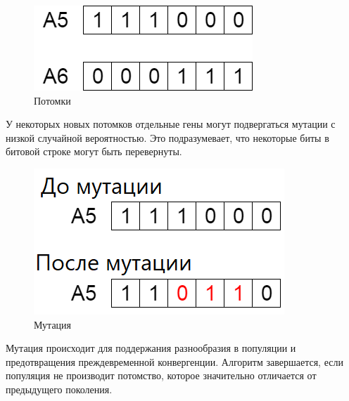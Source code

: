\begin{figure}[H]
  \centering
  \includegraphics[width=0.5\linewidth]{./img/child}
  \caption{Потомки}
  \label{fig:mpr}
\end{figure}

У некоторых новых потомков отдельные  гены могут подвергаться мутации с низкой случайной вероятностью. Это подразумевает, что некоторые биты в битовой строке могут быть перевернуты.

\begin{figure}[H]
  \centering
  \includegraphics[width=0.5\linewidth]{./img/mutation}
  \caption{Мутация}
  \label{fig:mpr}
\end{figure}

Мутация происходит для поддержания разнообразия в популяции и предотвращения преждевременной конвергенции. Алгоритм завершается, если популяция не производит потомство, которое значительно отличается от предыдущего поколения. 